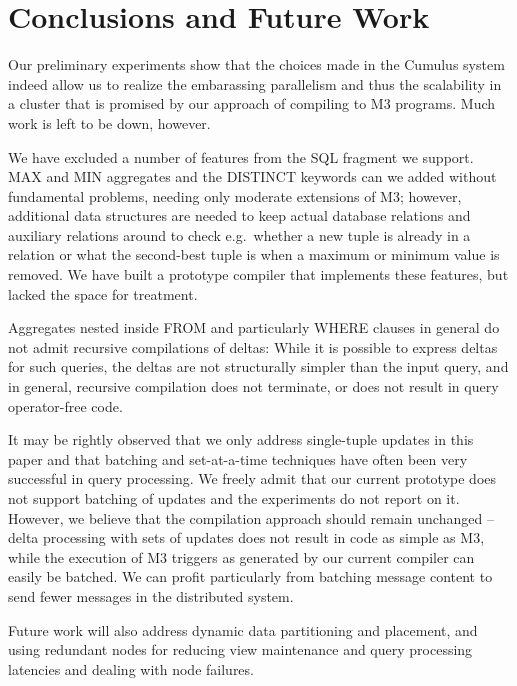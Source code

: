 

\section{Conclusions and Future Work}
\label{sec:conclusions}


Our preliminary experiments show that the choices made in the Cumulus
system indeed allow us to realize the embarassing parallelism and
thus the scalability in a cluster that is promised by our approach of
compiling to M3 programs. Much work is left to be down, however.


We have excluded a number of features from the SQL fragment we support.
MAX and MIN aggregates and the DISTINCT keywords can we added without
fundamental problems, needing only moderate extensions of M3; however,
additional data structures are needed to keep actual database relations
and auxiliary relations
around to check e.g.\ whether a new tuple is already in a relation or what the
second-best tuple is when a maximum or minimum value is removed. We
have built a prototype compiler that implements these features, but lacked the
space for treatment.

Aggregates nested inside FROM and particularly WHERE clauses in general
do not admit recursive compilations of deltas: While it is possible to express
deltas for such queries, the deltas are not structurally simpler than the
input query, and in general, recursive compilation does not terminate,
or does not result in query operator-free code.

It may be rightly observed that we only address single-tuple updates
in this paper and that batching and set-at-a-time techniques have often been
very successful in query processing. We freely admit that our current prototype
does not support batching of updates and the experiments do not report on it.
However, we believe that the compilation approach
should remain unchanged -- delta processing with sets of updates does not
result in code as simple as M3, while the
execution of M3 triggers as generated by our current compiler
can easily be batched. We can profit
particularly from batching message content to send fewer messages in the
distributed system. 

Future work will also address dynamic data partitioning and placement,
and using redundant nodes for reducing view maintenance and query processing
latencies and dealing with node failures.


